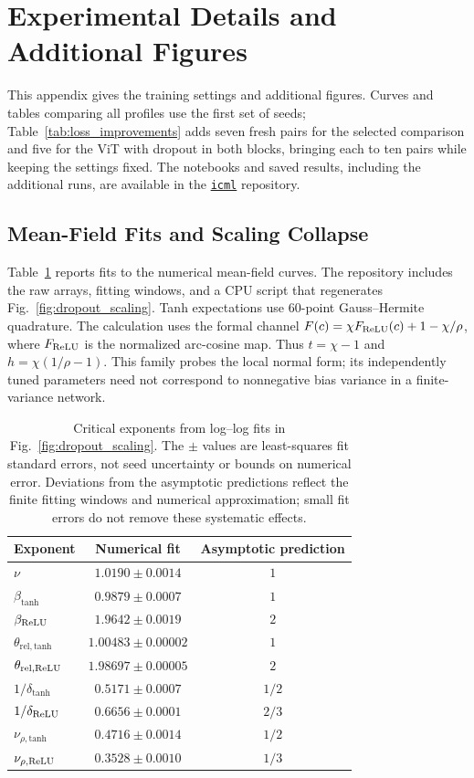 \section{Experimental Details and Additional Figures}
\label{app:experimental_info}
This appendix gives the training settings and additional figures. Curves and tables comparing all profiles use the first set of seeds; Table~\ref{tab:loss_improvements} adds seven fresh pairs for the selected \relu{} comparison and five for the ViT with dropout in both blocks, bringing each to ten pairs while keeping the settings fixed. The notebooks and saved results, including the additional runs, are available in the \href{https://github.com/luklacasito/icml}{\texttt{icml}} repository.

\subsection{Mean-Field Fits and Scaling Collapse}
Table~\ref{tab:mf_vs_fit_exponents} reports fits to the numerical mean-field curves. The repository includes the raw arrays, fitting windows, and a CPU script that regenerates Fig.~\ref{fig:dropout_scaling}. Tanh expectations use 60-point Gauss--Hermite quadrature. The \relu{} calculation uses the formal channel $F(c)=\chi F_{\operatorname{ReLU}}(c)+1-\chi/\rho$, where $F_{\operatorname{ReLU}}$ is the normalized arc-cosine map. Thus $t=\chi-1$ and $h=\chi(1/\rho-1)$. This family probes the local normal form; its independently tuned parameters need not correspond to nonnegative bias variance in a finite-variance \relu{} network.
\begin{table}[ht]
\caption{Critical exponents from log--log fits in Fig.~\ref{fig:dropout_scaling}. The $\pm$ values are least-squares fit standard errors, not seed uncertainty or bounds on numerical error. Deviations from the asymptotic predictions reflect the finite fitting windows and numerical approximation; small fit errors do not remove these systematic effects.}
\label{tab:mf_vs_fit_exponents}
\centering
\begin{tabular}{lcc}
\toprule
Exponent & Numerical fit & Asymptotic prediction \\
\midrule
$\nu$ & $1.0190 \pm 0.0014$ & $1$ \\
$\beta_{\mathrm{tanh}}$ & $0.9879 \pm 0.0007$ & $1$ \\
$\beta_{\operatorname{ReLU}}$ & $1.9642 \pm 0.0019$ & $2$ \\
$\theta_{\mathrm{rel,tanh}}$ & $1.00483 \pm 0.00002$ & $1$ \\
$\theta_{\mathrm{rel},\operatorname{ReLU}}$ & $1.98697 \pm 0.00005$ & $2$ \\
$1/\delta_{\mathrm{tanh}}$ & $0.5171 \pm 0.0007$ & $1/2$ \\
$1/\delta_{\operatorname{ReLU}}$ & $0.6656 \pm 0.0001$ & $2/3$ \\
$\nu_{\rho,\mathrm{tanh}}$ & $0.4716 \pm 0.0014$ & $1/2$ \\
$\nu_{\rho,\operatorname{ReLU}}$ & $0.3528 \pm 0.0010$ & $1/3$ \\
\bottomrule
\end{tabular}
\end{table}

